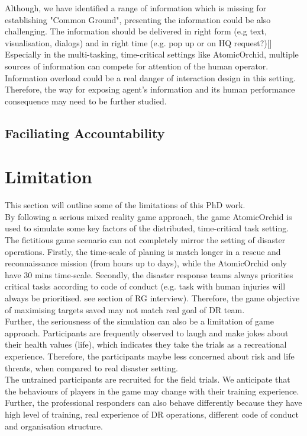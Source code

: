 Although, we have identified a range of information which is missing for establishing "Common Ground", presenting the information could be also challenging. The information should be delivered in right form (e.g text, visualisation, dialogs) and in right time (e.g. pop up or on HQ request?)[] Especially in the multi-tasking, time-critical settings like AtomicOrchid, multiple sources of information can compete for attention of the human operator. Information overload could be a real danger of interaction design in this setting. Therefore, the  way for exposing agent's information and its human performance consequence may need to be further studied.   \\


\subsection{Faciliating Accountability}\label{sec:conclusionAC}

\section{Limitation}
This section will outline some of the limitations of this PhD work. \\

By following a serious mixed reality game approach, the game AtomicOrchid is used to simulate some key factors of the distributed, time-critical task setting.  The fictitious game scenario can not completely mirror the setting of disaster operations. Firstly, the time-scale of planing is match longer in a rescue and reconnaissance mission (from hours up to days), while the AtomicOrchid only have 30 mins time-scale. Secondly, the disaster response teams always priorities critical tasks according to code of conduct (e.g. task with human injuries will always be prioritised. see section of RG interview). Therefore, the game objective of maximising targets saved may not match real goal of DR team.  \\

Further, the seriousness of the simulation can also be a limitation of game approach. Participants are frequently observed to laugh and make jokes about their health values (life), which indicates they take the trials as a recreational experience. Therefore, the participants maybe less concerned about risk and life threats, when compared to real disaster setting. \\

The untrained participants are recruited for the field trials. We anticipate that the behaviours of players in the game may change with their training experience. Further, the professional responders can also behave differently because they have high level of training, real experience of DR operations, different code of conduct and organisation structure.\\


